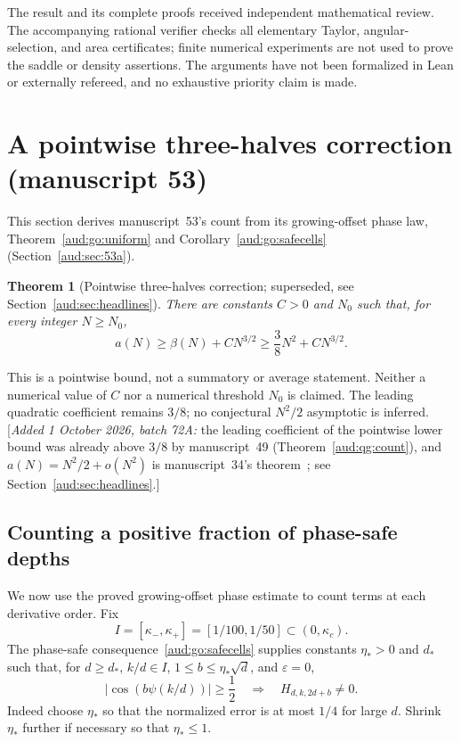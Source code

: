 \documentclass[11pt,a4paper]{article}
\numberwithin{equation}{section}
\newtheorem{theorem}{Theorem}[section]
\newcommand{\addednote}[1]{{\small[\textit{Added 1 October 2026, batch 72A:} #1]}}
\begin{document}
The result and its complete proofs received independent mathematical review. The accompanying rational verifier checks all elementary Taylor, angular-selection, and area certificates; finite numerical experiments are not used to prove the saddle or density assertions. The arguments have not been formalized in Lean or externally refereed, and no exhaustive priority claim is made.
\section{A pointwise three-halves correction (manuscript 53)}\label{aud:sec:53b}
This section derives manuscript~53's count from its growing-offset phase law, Theorem~\ref{aud:go:uniform} and Corollary~\ref{aud:go:safecells} (Section~\ref{aud:sec:53a}).

\begin{theorem}[Pointwise three-halves correction; superseded, see Section~\ref{aud:sec:headlines}]\label{aud:go:main}
There are constants $C>0$ and $N_0$ such that, for every integer $N\ge N_0$,
\begin{equation}\label{aud:go:mainbound}
 a(N)\ge\beta(N)+CN^{3/2}\ge\frac38N^2+CN^{3/2}.
\end{equation}
\end{theorem}

This is a pointwise bound, not a summatory or average statement. Neither a numerical value of $C$ nor a numerical threshold $N_0$ is claimed. The leading quadratic coefficient remains $3/8$; no conjectural $N^2/2$ asymptotic is inferred. \addednote{the leading coefficient of the pointwise lower bound was already above $3/8$ by manuscript~49 (Theorem~\ref{aud:qg:count}), and $a(N)=N^2/2+o(N^2)$ is manuscript~34\textquoteright s theorem~\cite{pte}; see Section~\ref{aud:sec:headlines}.}
\subsection{Counting a positive fraction of phase-safe depths}
We now use the proved growing-offset phase estimate to count terms at each derivative order. Fix
\[
 I=[\kappa_-,\kappa_+]=[1/100,1/50]\subset(0,\kappa_c).
\]
The phase-safe consequence~\ref{aud:go:safecells} supplies constants $\eta_*>0$ and $d_*$ such that, for $d\ge d_*$, $k/d\in I$, $1\le b\le\eta_*\sqrt d$, and $\varepsilon=0$,
\begin{equation}\label{aud:go:safesufficient}
 |\cos(b\psi(k/d))|\ge\frac12
 \quad\Longrightarrow\quad H_{d,k,2d+b}\ne0.
\end{equation}
Indeed choose $\eta_*$ so that the normalized error is at most $1/4$ for large $d$. Shrink $\eta_*$ further if necessary so that $\eta_*\le1$.
\end{document}
